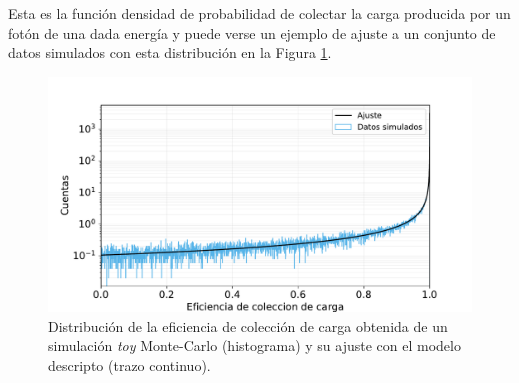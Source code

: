 Esta es la función densidad de probabilidad de colectar la carga producida por un fotón de una dada energía y puede verse un ejemplo de ajuste a un conjunto de datos simulados con esta distribución en la Figura \ref{fig:BetaDistyAjuste}.
\begin{figure}[h]
    \centering
        \includegraphics[scale=0.5]{Figs/BetaDistyAjuste.pdf}
    \caption{Distribución de la eficiencia de colección de carga obtenida de un simulación \textit{toy} Monte-Carlo (histograma) y su ajuste con el modelo descripto (trazo continuo).}
    \label{fig:BetaDistyAjuste}
\end{figure}


